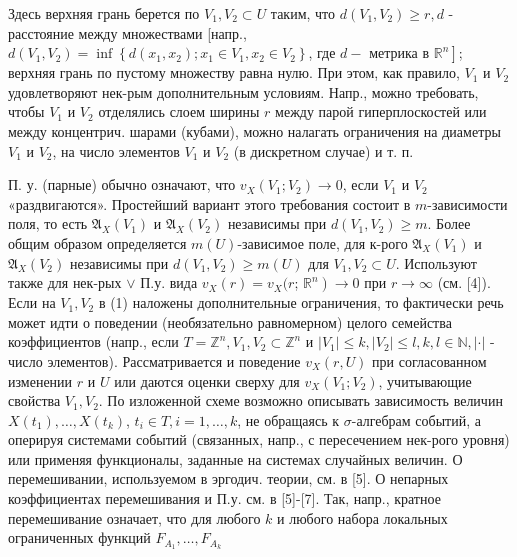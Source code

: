 \documentclass[10pt]{article}
\begin{document}
Здесь верхняя грань берется по $V_{1}, V_{2} \subset U$ таким, что $d\left(V_{1}, V_{2}\right) \geqslant r, d$ - расстояние между множествами [напр., $d\left(V_{1}, V_{2}\right)=\inf \left\{d\left(x_{1}, x_{2}\right) ; x_{1} \in V_{1}, x_{2} \in V_{2}\right\}$, где $d-$ метрика в $\left.\mathbb{R}^{n}\right]$; верхняя грань по пустому множеству равна нулю. При этом, как правило, $V_{1}$ и $V_{2}$ удовлетворяют нек-рым дополнительным условиям. Напр., можно требовать, чтобы $V_{1}$ и $V_{2}$ отделялись слоем ширины $r$ между парой гиперплоскостей или между концентрич. шарами (кубами), можно налагать ограничения на диаметры $V_{1}$ и $V_{2}$, на число элементов $V_{1}$ и $V_{2}$ (в дискретном случае) и т. п.



П. у. (парные) обычно означают, что $v_{X}\left(V_{1} ; V_{2}\right) \rightarrow 0$, если $V_{1}$ и $V_{2}$ «раздвигаются». Простейший вариант этого требования состоит в $m$-зависимости поля, то есть $\mathfrak{A}_{X}\left(V_{1}\right)$ и $\mathfrak{A}_{X}\left(V_{2}\right)$ независимы при $d\left(V_{1}, V_{2}\right) \geqslant m$. Более общим образом определяется $m(U)$-зависимое поле, для к-рого $\mathfrak{A}_{X}\left(V_{1}\right)$ и $\mathfrak{A}_{X}\left(V_{2}\right)$ независимы при $d\left(V_{1}, V_{2}\right) \geqslant m(U)$ для $V_{1}, V_{2} \subset U$. Используют также для нек-рых $\vee$ П.у. вида $v_{X}(r)=v_{X}(r$; $\left.\mathbb{R}^{n}\right) \rightarrow 0$ при $r \rightarrow \infty$ (см. [4]). Если на $V_{1}, V_{2}$ в (1) наложены дополнительные ограничения, то фактически речь может идти о поведении (необязательно равномерном) целого семейства коэффициентов (напр., если $T=\mathbb{Z}^{n}, V_{1}, V_{2} \subset \mathbb{Z}^{n}$ и $\left|V_{1}\right| \leqslant k,\left|V_{2}\right| \leqslant l, k, l \in \mathbb{N},|\cdot|$ - число элементов). Рассматривается и поведение $v_{X}(r, U)$ при согласованном изменении $r$ и $U$ или даются оценки сверху для $v_{X}\left(V_{1} ; V_{2}\right)$, учитывающие свойства $V_{1}, V_{2}$. По изложенной схеме возможно описывать зависимость величин $X\left(t_{1}\right), \ldots, X\left(t_{k}\right)$, $t_{i} \in T, i=1, \ldots, k$, не обращаясь к $\sigma$-алгебрам событий, а оперируя системами событий (связанных, напр., с пересечением нек-рого уровня) или применяя функционалы, заданные на системах случайных величин. О перемешивании, используемом в эргодич. теории, см. в [5]. О непарных коэффициентах перемешивания и П.у. см. в [5]-[7]. Так, напр., кратное перемешивание означает, что для любого $k$ и любого набора локальных ограниченных функций $F_{A_{1}}, \ldots, F_{A_{k}}$
\end{document}
